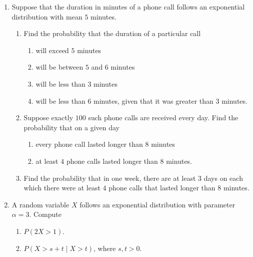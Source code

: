 \documentclass[svgnames]{amsart}
\begin{document}
\begin{enumerate}[leftmargin=*]
\item Suppose that the duration in minutes of a phone call follows an exponential distribution with mean $5$ minutes.
\begin{enumerate}
\item  Find the probability that the duration of a particular call
\begin{enumerate}
	\item will exceed $5$ minutes
	\item will be between $5$ and $6$ minutes
	\item will be less than $3$ minutes
	\item will be less than $6$ minutes, given that it was greater than $3$ minutes.
\end{enumerate}
\item Suppose exactly $100$ such phone calls are received every day. Find the probability that on a given day
\begin{enumerate}
	\item every phone call lasted longer than $8$ minutes
	\item at least $4$ phone calls lasted longer than $8$ minutes.
\end{enumerate}
\item Find the probability that in one week, there are at least $3$ days on each which there were at least $4$ phone calls that lasted longer than $8$ minutes.
\end{enumerate}

\item A random variable $X$ follows an exponential distribution with parameter $\alpha = 3$. Compute
\begin{enumerate}
	\item $P(2X > 1)$.
	\item $P(X > s + t \mid X > t)$, where $s, t > 0$.
\end{enumerate}

\end{enumerate}
\end{document}
